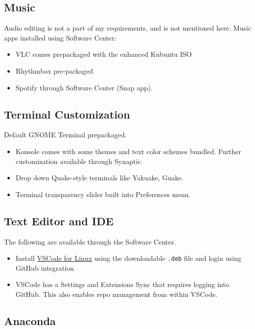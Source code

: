 \documentclass[8pt,a4paper]{article}
\begin{document}
\subsection{Music}

Audio editing is not a part of my requirements, and is not mentioned here.
Music apps installed using Software Center:

\begin{itemize}
	\item VLC comes prepackaged with the enhanced Kubuntu ISO
	\item Rhythmbox pre-packaged
	\item Spotify through Software Center (Snap app).
\end{itemize}

\subsection{Terminal Customization}

Default GNOME Terminal prepackaged.

\begin{itemize}
	\item Konsole comes with some themes and text color schemes bundled. Further customization available through Synaptic.
	\item Drop down Quake-style terminals like Yakuake, Guake.
	\item Terminal transparency slider built into Preferences menu.
\end{itemize}

\subsection{Text Editor and IDE}
The following are available through the Software Center.

\begin{itemize}
	\item Install \href{https://code.visualstudio.com/docs/setup/linux}{VSCode for Linux} using the downloadable \texttt{.deb} file and login using GitHub integration
	\item VSCode has a Settings and Extensions Sync that requires logging into GitHub. This also enables repo management from within VSCode.
\end{itemize}

\subsection{Anaconda}
\end{document}
